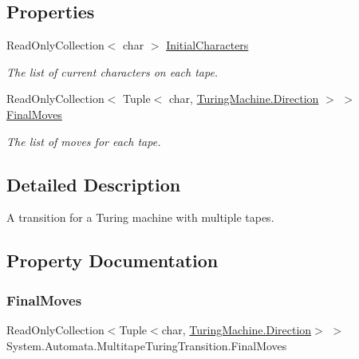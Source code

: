 \subsection*{Properties}
\begin{DoxyCompactItemize}
\item 
Read\+Only\+Collection$<$ char $>$ \mbox{\hyperlink{class_system_1_1_automata_1_1_multitape_turing_transition_ac75736919c5dd909eda605dbb2e1a963}{Initial\+Characters}}
\begin{DoxyCompactList}\small\item\em The list of current characters on each tape. \end{DoxyCompactList}\item 
Read\+Only\+Collection$<$ Tuple$<$ char, \mbox{\hyperlink{class_system_1_1_automata_1_1_turing_machine_aa253c3820befa3cfdd3d17b2d8fdd2d9}{Turing\+Machine.\+Direction}} $>$ $>$ \mbox{\hyperlink{class_system_1_1_automata_1_1_multitape_turing_transition_a448257e60c734d530225bf3770673732}{Final\+Moves}}
\begin{DoxyCompactList}\small\item\em The list of moves for each tape. \end{DoxyCompactList}\end{DoxyCompactItemize}


\subsection{Detailed Description}
A transition for a Turing machine with multiple tapes. 



\subsection{Property Documentation}
\mbox{\label{class_system_1_1_automata_1_1_multitape_turing_transition_a448257e60c734d530225bf3770673732}} 
\subsubsection{\texorpdfstring{Final\+Moves}{FinalMoves}}
{\footnotesize\ttfamily Read\+Only\+Collection$<$Tuple$<$char, \mbox{\hyperlink{class_system_1_1_automata_1_1_turing_machine_aa253c3820befa3cfdd3d17b2d8fdd2d9}{Turing\+Machine.\+Direction}}$>$ $>$ System.\+Automata.\+Multitape\+Turing\+Transition.\+Final\+Moves\hspace{0.3cm}{\ttfamily [get]}}



